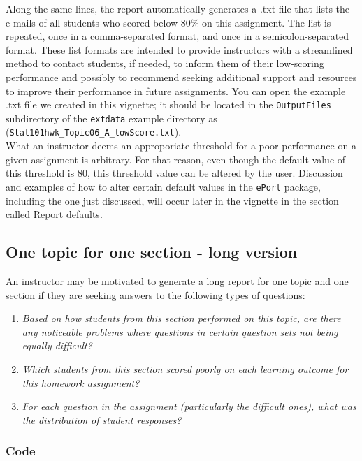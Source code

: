 \documentclass{article}\usepackage[]{graphicx}\usepackage[]{color}
\numberwithin{equation}{section} %
\begin{document}
Along the same lines, the report automatically generates a .txt file that lists the e-mails of all students who scored below 80\% on this assignment. The list is repeated, once in a comma-separated format, and once in a semicolon-separated format. These list formats are intended to provide instructors with a streamlined method to contact students, if needed, to inform them of their low-scoring performance and possibly to recommend seeking additional support and resources to improve their performance in future assignments. You can open the example .txt file we created in this vignette; it should be located in the \texttt{OutputFiles} subdirectory of the \texttt{extdata} example directory as (\texttt{Stat101hwk\_Topic06\_A\_lowScore.txt}).\\

What an instructor deems an approporiate threshold for a poor performance on a given assignment is arbitrary. For that reason, even though the default value of this threshold is 80, this threshold value can be altered by the user. Discussion and examples of how to alter certain default values in the \texttt{ePort} package, including the one just discussed, will occur later in the vignette in the section called \hyperref[sec:repOptions]{Report defaults}.

\subsection{One topic for one section - long version}

An instructor may be motivated to generate a long report for one topic and one section if they are seeking answers to the following types of questions:

\begin{enumerate}
\item \textit{Based on how students from this section performed on this topic, are there any noticeable problems where questions in certain question sets not being equally difficult?}
\item \textit{Which students from this section scored poorly on each learning outcome for this homework assignment?}
\item \textit{For each question in the assignment (particularly the difficult ones), what was the distribution of student responses?}
\end{enumerate}

\subsubsection{Code}
\end{document}
